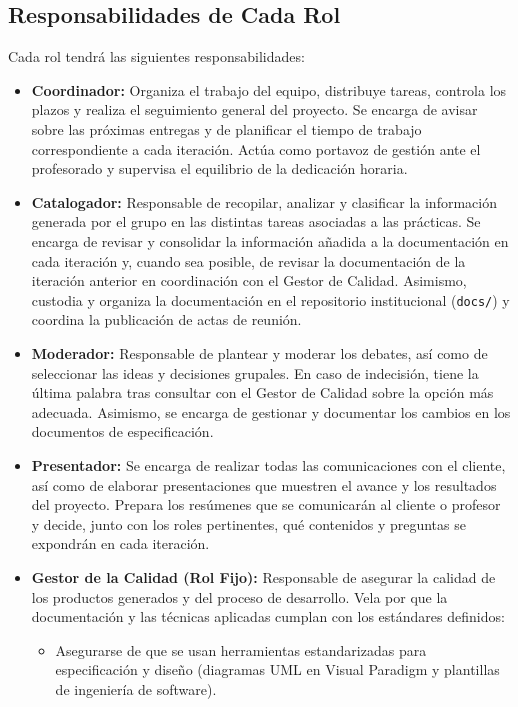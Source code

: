 \subsection{Responsabilidades de Cada Rol}
Cada rol tendrá las siguientes responsabilidades:
\begin{itemize}[leftmargin=*]
  \item \textbf{Coordinador:} Organiza el trabajo del equipo, distribuye tareas, controla los plazos y realiza el seguimiento general del proyecto. Se encarga de avisar sobre las próximas entregas y de planificar el tiempo de trabajo correspondiente a cada iteración. Actúa como portavoz de gestión ante el profesorado y supervisa el equilibrio de la dedicación horaria.
  \item \textbf{Catalogador:} Responsable de recopilar, analizar y clasificar la información generada por el grupo en las distintas tareas asociadas a las prácticas. Se encarga de revisar y consolidar la información añadida a la documentación en cada iteración y, cuando sea posible, de revisar la documentación de la iteración anterior en coordinación con el Gestor de Calidad. Asimismo, custodia y organiza la documentación en el repositorio institucional (\texttt{docs/}) y coordina la publicación de actas de reunión.
  \item \textbf{Moderador:} Responsable de plantear y moderar los debates, así como de seleccionar las ideas y decisiones grupales. En caso de indecisión, tiene la última palabra tras consultar con el Gestor de Calidad sobre la opción más adecuada. Asimismo, se encarga de gestionar y documentar los cambios en los documentos de especificación.
  \item \textbf{Presentador:} Se encarga de realizar todas las comunicaciones con el cliente, así como de elaborar presentaciones que muestren el avance y los resultados del proyecto. Prepara los resúmenes que se comunicarán al cliente o profesor y decide, junto con los roles pertinentes, qué contenidos y preguntas se expondrán en cada iteración.
  \item \textbf{Gestor de la Calidad (Rol Fijo):} Responsable de asegurar la calidad de los productos generados y del proceso de desarrollo. Vela por que la documentación y las técnicas aplicadas cumplan con los estándares definidos:
    \begin{itemize}
      \item Asegurarse de que se usan herramientas estandarizadas para especificación y diseño (diagramas UML en Visual Paradigm y plantillas de ingeniería de software).

\end{itemize}
\end{itemize}
